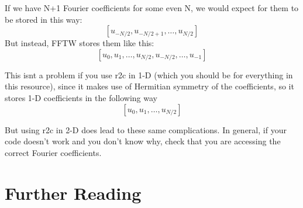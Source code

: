 \documentclass[a4paper,11pt]{article}
\theoremstyle{plain} %
\theoremstyle{remark}
\theoremstyle{definition} %
\begin{document}
If we have N+1 Fourier coefficients for some even N, we would expect for them to be stored in this way:
\[
[u_{-N/2},u_{-N/2+1},\dots, u_{N/2}]
\]
But instead, FFTW stores them like this: 
\[
[u_0,u_1, \dots, u_{N/2}, u_{-N/2}, \dots, u_{-1}]
\]

This isnt a problem if you use r2c in 1-D (which you should be for everything in this resource), since it makes use of Hermitian symmetry of the coefficients, so it stores 1-D coefficients in the following way
\[
[u_0,u_1, \dots, u_{N/2}]
\]

But using r2c in 2-D does lead to these same complications. In general, if your code doesn't work and you don't know why, check that you are accessing the correct Fourier coefficients.

\section{Further Reading}
\end{document}
